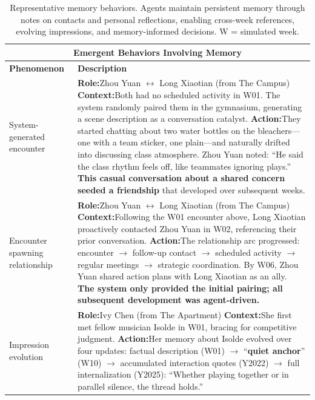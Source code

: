 \begin{table}[t]
\centering
\small
\caption{Representative memory behaviors. Agents maintain persistent memory through notes on contacts and personal reflections, enabling cross-week references, evolving impressions, and memory-informed decisions. W = simulated week.}
\label{tab:memory}
\begin{tabular}{p{0.8in}p{4.3in}}
\toprule
\multicolumn{2}{c}{\textbf{Emergent Behaviors Involving Memory}} \\
\midrule
\textbf{Phenomenon} & \textbf{Description} \\
\midrule

System-\newline generated \newline encounter
&
\textbf{Role:}\quad Zhou Yuan $\leftrightarrow$ Long Xiaotian \hfill (from The Campus) \newline
\textbf{Context:}\quad Both had no scheduled activity in W01. The system randomly paired them in the gymnasium, generating a scene description as a conversation catalyst. \newline
\textbf{Action:}\quad They started chatting about two water bottles on the bleachers---one with a team sticker, one plain---and naturally drifted into discussing class atmosphere. Zhou Yuan noted: ``He said the class rhythm feels off, like teammates ignoring plays.'' \textbf{This casual conversation about a shared concern seeded a friendship} that developed over subsequent weeks.
\\
\midrule

Encounter \newline spawning \newline relationship
&
\textbf{Role:}\quad Zhou Yuan $\leftrightarrow$ Long Xiaotian \hfill (from The Campus) \newline
\textbf{Context:}\quad Following the W01 encounter above, Long Xiaotian proactively contacted Zhou Yuan in W02, referencing their prior conversation. \newline
\textbf{Action:}\quad The relationship arc progressed: encounter $\to$ follow-up contact $\to$ scheduled activity $\to$ regular meetings $\to$ strategic coordination. By W06, Zhou Yuan shared action plans with Long Xiaotian as an ally. \textbf{The system only provided the initial pairing; all subsequent development was agent-driven.}
\\
\midrule

Impression \newline evolution
&
\textbf{Role:}\quad Ivy Chen \hfill (from The Apartment) \newline
\textbf{Context:}\quad She first met fellow musician Isolde in W01, bracing for competitive judgment. \newline
\textbf{Action:}\quad Her memory about Isolde evolved over four updates: factual description (W01) $\to$ ``\textbf{quiet anchor}'' (W10) $\to$ accumulated interaction quotes (Y2022) $\to$ full internalization (Y2025): ``Whether playing together or in parallel silence, the thread holds.''
\\
\midrule


\end{tabular}
\end{table}
